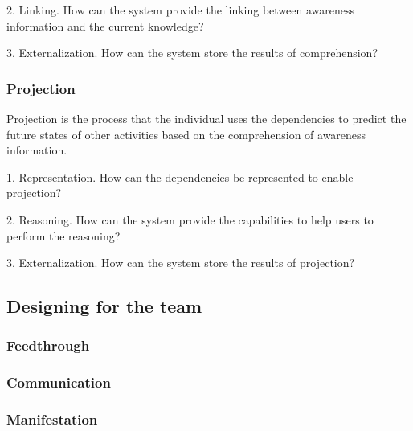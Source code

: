 2. Linking. How can the system provide the linking between awareness information and the current knowledge?

3. Externalization. How can the system store the results of comprehension?

\subsubsection*{Projection} %
\label{ssub:projection}
Projection is the process that the individual uses the dependencies to predict the future states of other activities based on the comprehension of awareness information.

1. Representation. How can the dependencies be represented to enable projection? 

2. Reasoning. How can the system provide the capabilities to help users to perform the reasoning?

3. Externalization. How can the system store the results of projection?


\subsection{Designing for the team} %
\label{sub:designing_for_the_team}

\subsubsection{Feedthrough} %
\label{ssub:feedthrough}

\subsubsection{Communication} %
\label{ssub:communication}


\subsubsection{Manifestation} %
\label{ssub:manifestation}






